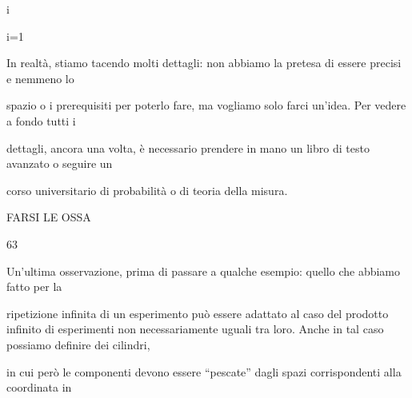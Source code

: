 \documentclass[a4paper,portrait,12pt]{article}
\begin{document}
\begin{flushleft}
i
\end{flushleft}





\begin{flushleft}
i=1
\end{flushleft}





\begin{flushleft}
In realt\`{a}, stiamo tacendo molti dettagli: non abbiamo la pretesa di essere precisi e nemmeno lo
\end{flushleft}


\begin{flushleft}
spazio o i prerequisiti per poterlo fare, ma vogliamo solo farci un'idea. Per vedere a fondo tutti i
\end{flushleft}


\begin{flushleft}
dettagli, ancora una volta, \`{e} necessario prendere in mano un libro di testo avanzato o seguire un
\end{flushleft}


\begin{flushleft}
corso universitario di probabilit\`{a} o di teoria della misura.
\end{flushleft}





\begin{flushleft}
 FARSI LE OSSA
\end{flushleft}





63





\begin{flushleft}
Un'ultima osservazione, prima di passare a qualche esempio: quello che abbiamo fatto per la
\end{flushleft}


\begin{flushleft}
ripetizione infinita di un esperimento pu\`{o} essere adattato al caso del prodotto infinito di esperimenti non necessariamente uguali tra loro. Anche in tal caso possiamo definire dei cilindri,
\end{flushleft}


\begin{flushleft}
in cui per\`{o} le componenti devono essere {``}pescate'' dagli spazi corrispondenti alla coordinata in
\end{flushleft}
\end{document}
